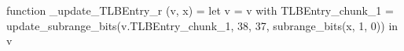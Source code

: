 function _update_TLBEntry_r (v, x) = let v = { v with TLBEntry_chunk_1 = update_subrange_bits(v.TLBEntry_chunk_1, 38, 37, subrange_bits(x, 1, 0)) } in
  v
